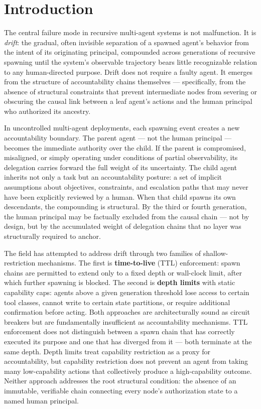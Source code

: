 \section{Introduction}\label{sec:introduction}

The central failure mode in recursive multi-agent systems is not malfunction.
It is \emph{drift}: the gradual, often invisible separation of a spawned agent's
behavior from the intent of its originating principal, compounded across
generations of recursive spawning until the system's observable trajectory
bears little recognizable relation to any human-directed purpose.  Drift does
not require a faulty agent.  It emerges from the structure of accountability
chains themselves — specifically, from the absence of structural constraints that
prevent intermediate nodes from severing or obscuring the causal link between
a leaf agent's actions and the human principal who authorized its ancestry.

In uncontrolled multi-agent deployments, each spawning event creates a new
accountability boundary.  The parent agent — not the human principal — becomes
the immediate authority over the child.  If the parent is compromised,
misaligned, or simply operating under conditions of partial observability,
its delegation carries forward the full weight of its uncertainty.  The child
agent inherits not only a task but an accountability posture: a set of
implicit assumptions about objectives, constraints, and escalation paths that
may never have been explicitly reviewed by a human.  When that child spawns
its own descendants, the compounding is structural.  By the third or fourth
generation, the human principal may be factually excluded from the causal
chain — not by design, but by the accumulated weight of delegation chains
that no layer was structurally required to anchor.

The field has attempted to address drift through two families of
shallow-restriction mechanisms.  The first is \textbf{time-to-live} (TTL)
enforcement: spawn chains are permitted to extend only to a fixed depth or
wall-clock limit, after which further spawning is blocked.  The second is
\textbf{depth limits} with static capability caps: agents above a given
generation threshold lose access to certain tool classes, cannot write to
certain state partitions, or require additional confirmation before acting.
Both approaches are architecturally sound as circuit breakers but are
fundamentally insufficient as accountability mechanisms.  TTL enforcement
does not distinguish between a spawn chain that has correctly executed its
purpose and one that has diverged from it — both terminate at the same depth.
Depth limits treat capability restriction as a proxy for accountability, but
capability restriction does not prevent an agent from taking many low-capability
actions that collectively produce a high-capability outcome.  Neither approach
addresses the root structural condition: the absence of an immutable,
verifiable chain connecting every node's authorization state to a named human
principal.

